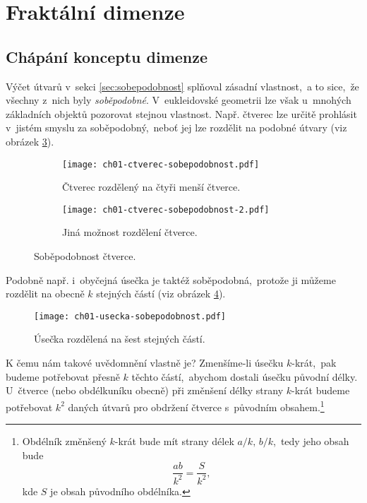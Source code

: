 \section{Fraktální dimenze}\label{sec:fraktalni_dimenze}

\subsection{Chápání konceptu dimenze}\label{subsec:koncept-dimenze}

Výčet útvarů v~sekci \ref{sec:sobepodobnost} splňoval zásadní vlastnost,~a to sice,~že všechny z~nich byly \emph{soběpodobné}. V~eukleidovské geometrii lze však u~mnohých základních objektů pozorovat stejnou vlastnost. Např. čtverec lze určitě prohlásit v~jistém smyslu za soběpodobný,~neboť jej lze rozdělit na podobné útvary (viz obrázek \ref{fig:sobepodobnost-ctverce}).
\begin{figure}[h]
    \centering
    \begin{subfigure}[b]{\subfigwidth}
        \centering
        \texttt{[image: ch01-ctverec-sobepodobnost.pdf]}
        \caption{Čtverec rozdělený na čtyři menší čtverce.}
        \label{subfig:sobepodobnost-ctverce-1}
    \end{subfigure}
    \begin{subfigure}[b]{\subfigwidth}
        \centering
        \texttt{[image: ch01-ctverec-sobepodobnost-2.pdf]}
        \caption{Jiná možnost rozdělení čtverce.}
        \label{subfig:sobepodobnost-ctverce-2}
    \end{subfigure}
    \caption{Soběpodobnost čtverce.}
    \label{fig:sobepodobnost-ctverce}
\end{figure}
Podobně např. i~obyčejná úsečka je taktéž soběpodobná,~protože ji můžeme rozdělit na obecně $k$ stejných částí (viz obrázek \ref*{fig:sobepodobnost-usecky}).\par
\begin{figure}[h]
    \centering
    \texttt{[image: ch01-usecka-sobepodobnost.pdf]}
    \caption{Úsečka rozdělená na šest stejných částí.}
    \label{fig:sobepodobnost-usecky}
\end{figure}
K čemu nám takové uvědomnění vlastně je? Zmenšíme-li úsečku $k$-krát,~pak budeme potřebovat přesně $k$ těchto částí,~abychom dostali úsečku původní délky. U~čtverce (nebo obdélkuníku obecně) při změnšení délky strany $k$-krát budeme potřebovat $k^2$ daných útvarů pro obdržení čtverce s~původním obsahem.\footnote{Obdélník změnšený $k$-krát bude mít strany délek $a/k,\,b/k$,~tedy jeho obsah bude
\[\dfrac{ab}{k^2}=\dfrac{S}{k^2},\]
kde $S$ je obsah původního obdélníka.}
